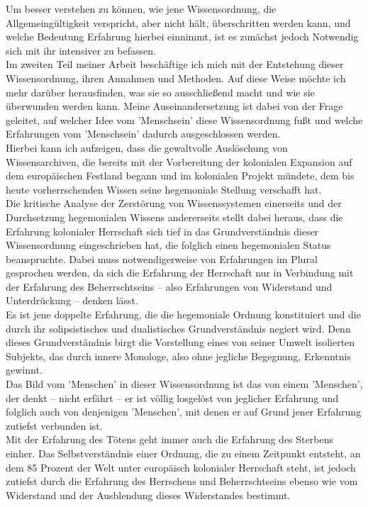 \noindent Um besser verstehen zu können, wie jene Wissensordnung, die Allgemeingültigkeit
verspricht, aber nicht hält, überschritten werden kann, und welche Bedeutung
Erfahrung hierbei einnimmt, ist es zunächst jedoch Notwendig sich mit ihr
intensiver zu befassen.\\

\noindent Im zweiten Teil meiner Arbeit beschäftige ich mich mit
der Entstehung dieser Wissensordnung, ihren Annahmen und Methoden. Auf diese
Weise möchte ich mehr darüber herausfinden, was sie so ausschließend macht und
wie sie überwunden werden kann. Meine Auseinandersetzung ist dabei von der Frage
geleitet, auf welcher Idee vom 'Menschsein' diese Wissensordnung fußt und welche
Erfahrungen vom 'Menschsein' dadurch ausgeschlossen werden.\\
 Hierbei kann ich
aufzeigen, dass die gewaltvolle Auslöschung von Wissensarchiven, die bereits mit
der Vorbereitung der kolonialen Expansion auf dem europäischen Festland begann
und im kolonialen Projekt mündete, dem bis heute vorherrschenden Wissen seine
hegemoniale Stellung verschafft hat. \\
Die kritische Analyse der Zerstörung von
Wissenssystemen einerseits und der Durchsetzung hegemonialen Wissens
andererseits stellt dabei heraus, dass die Erfahrung kolonialer Herrschaft sich
tief in das Grundverständnis dieser Wissensordnung eingeschrieben hat, die
folglich einen hegemonialen Status beanspruchte. Dabei muss notwendigerweise von
Erfahrungen im Plural gesprochen werden, da sich die Erfahrung der Herrschaft
nur in Verbindung mit der Erfahrung des Beherrschtseins – also Erfahrungen von
Widerstand und Unterdrückung – denken lässt.\\
 Es ist jene doppelte Erfahrung, die
die hegemoniale Ordnung konstituiert und die durch ihr solipsistisches und
dualistisches Grundverständnis negiert wird. Denn dieses Grundverständnis birgt
die Vorstellung eines von seiner Umwelt isolierten Subjekts, das durch innere
Monologe, also ohne jegliche Begegnung, Erkenntnis gewinnt.\\

\noindent Das Bild vom
'Menschen' in dieser Wissensordnung ist das von einem 'Menschen', der denkt –
nicht erfährt – er ist völlig losgelöst von jeglicher Erfahrung und folglich
auch von denjenigen 'Menschen', mit denen er auf Grund jener Erfahrung zutiefst
verbunden ist. \\
Mit der Erfahrung des Tötens geht immer auch die Erfahrung des
Sterbens einher. Das Selbstverständnis einer Ordnung, die zu einem Zeitpunkt
entsteht, an dem 85 Prozent der Welt unter europäisch kolonialer Herrschaft
steht, ist jedoch zutiefst durch die Erfahrung des Herrschens und
Beherrschtseins ebenso wie vom Widerstand und der Ausblendung dieses
Widerstandes bestimmt.\\

